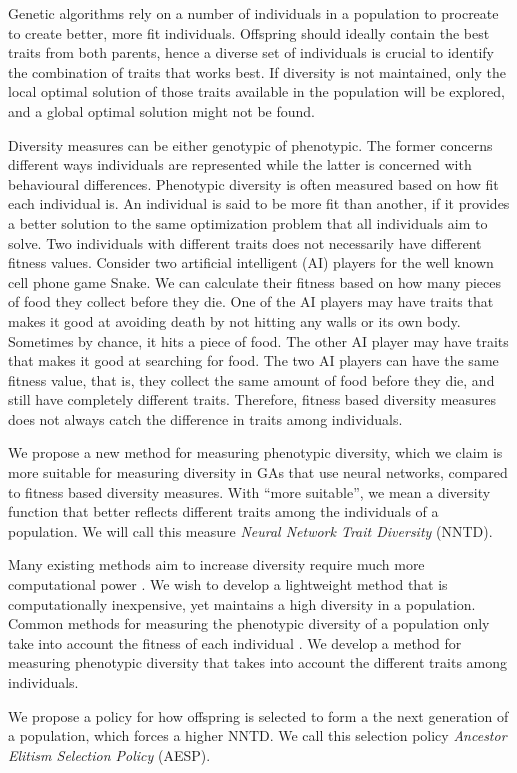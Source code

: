 Genetic algorithms rely on a number of individuals in a population to procreate to create better, more fit individuals. Offspring should ideally contain the best traits from both parents, hence a diverse set of individuals is crucial to identify the combination of traits that works best. If diversity is not maintained, only the local optimal solution of those traits available in the population will be explored, and a global optimal solution might not be found.
\cite{ursem2002diversity}

Diversity measures can be either genotypic of phenotypic.
The former concerns different ways individuals are represented while the latter is concerned with behavioural differences.
Phenotypic diversity is often measured based on how fit each individual is. 
An individual is said to be more fit than another, if it provides a better solution to the same optimization problem that all individuals aim to solve. 
Two individuals with different traits does not necessarily have different fitness values.
Consider two artificial intelligent (AI) players for the well known cell phone game Snake.
We can calculate their fitness based on how many pieces of food they collect before they die.
One of the AI players may have traits that makes it good at avoiding death by not hitting any walls or its own body.
Sometimes by chance, it hits a piece of food.
The other AI player may have traits that makes it good at searching for food.
The two AI players can have the same fitness value, that is, they collect the same amount of food before they die, and still have completely different traits. Therefore, fitness based diversity measures does not always catch the difference in traits among individuals.

We propose a new method for measuring phenotypic diversity, which we claim is more suitable for measuring diversity in GAs that use neural networks, compared to fitness based diversity measures.
With ``more suitable'', we mean a diversity function that better reflects different traits among the individuals of a population.
We will call this measure \emph{Neural Network Trait Diversity} (NNTD).

Many existing methods aim to increase diversity require much more computational power \citpls{}. We wish to develop a lightweight method that is computationally inexpensive, yet maintains a high diversity in a population. Common methods for measuring the phenotypic diversity of a population only take into account the fitness of each individual \citpls{}. We develop a method for measuring phenotypic diversity that takes into account the different traits among individuals.

We propose a policy for how offspring is selected to form a the next generation of a population, which forces a higher NNTD.
We call this selection policy \emph{Ancestor Elitism Selection Policy} (AESP).






